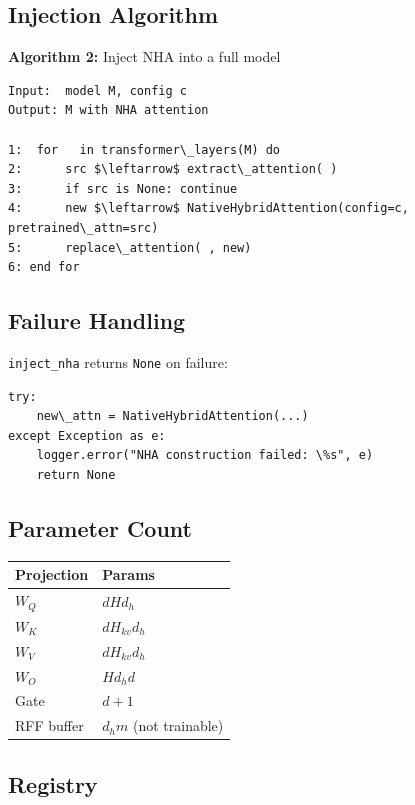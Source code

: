 \subsection{Injection Algorithm}

\textbf{Algorithm 2:} Inject NHA into a full model
\begin{lstlisting}
Input:  model M, config c
Output: M with NHA attention

1:  for   in transformer\_layers(M) do
2:      src $\leftarrow$ extract\_attention( )
3:      if src is None: continue
4:      new $\leftarrow$ NativeHybridAttention(config=c, pretrained\_attn=src)
5:      replace\_attention( , new)
6: end for
\end{lstlisting}

\subsection{Failure Handling}

\texttt{inject\_nha} returns \texttt{None} on failure:

\begin{lstlisting}
try:
    new\_attn = NativeHybridAttention(...)
except Exception as e:
    logger.error("NHA construction failed: \%s", e)
    return None
\end{lstlisting}

\subsection{Parameter Count}

\begin{table}[H]
\centering
\small
\begin{tabular}{ll}
\toprule
\textbf{Projection} & \textbf{Params} \\
\midrule
$W_Q$ & $d H d_h$ \\
$W_K$ & $d H_{kv} d_h$ \\
$W_V$ & $d H_{kv} d_h$ \\
$W_O$ & $H d_h d$ \\
Gate & $d + 1$ \\
RFF buffer & $d_h m$ (not trainable) \\
\bottomrule
\end{tabular}
\end{table}

\subsection{Registry}

